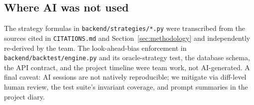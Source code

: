 \subsection*{Where AI was not used}

The strategy formulas in \texttt{backend/strategies/*.py} were transcribed from
the sources cited in \texttt{CITATIONS.md} and Section~\ref{sec:methodology} and
independently re-derived by the team. The look-ahead-bias enforcement in
\texttt{backend/backtest/engine.py} and its oracle-strategy test, the database
schema, the API contract, and the project timeline were team work, not
AI-generated. A final caveat: AI sessions are not natively reproducible; we
mitigate via diff-level human review, the test suite's invariant coverage, and
prompt summaries in the project diary.
